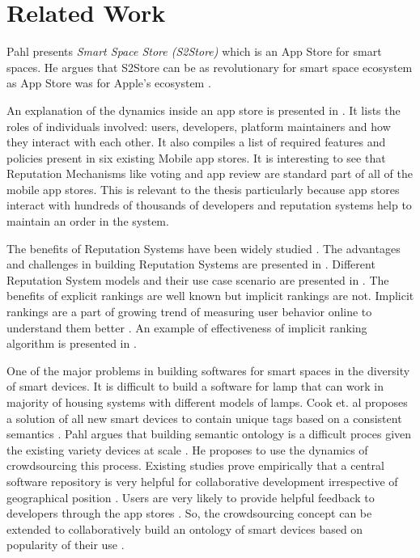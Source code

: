 \chapter{Related Work}

Pahl presents \emph{Smart Space Store (S2Store)} which is an App Store for smart spaces. He argues that S2Store can be as revolutionary for smart space ecosystem as App Store was for Apple's ecosystem \cite{pahl2014distributed}.

An explanation of the dynamics inside an app store is presented in \cite{Jansen}. It lists the roles of individuals involved: users, developers, platform maintainers and how they interact with each other. It also compiles a list of required features and policies present in six existing Mobile app stores. It is interesting to see that Reputation Mechanisms like voting and app review are standard part of all of the mobile app stores. This is relevant to the thesis particularly because app stores interact with hundreds of thousands of developers \cite{lim2012successful} and reputation systems help to maintain an order in the system.

The benefits of Reputation Systems have been widely studied \cite{Akerlof1970} \cite{Axelrod1984} \cite{Resnick2000} \cite{farmer2010building}. The advantages and challenges in building Reputation Systems are presented in \cite{Resnick2000}. Different Reputation System models and their use case scenario are presented in \cite{farmer2010building}. The benefits of explicit rankings are well known but implicit rankings are not. Implicit rankings are a part of growing trend of measuring user behavior online to understand them better \cite{claypool2001inferring}. An example of effectiveness of implicit ranking algorithm is presented in \cite{girardello2010explicit}.

One of the major problems in building softwares for smart spaces in the diversity of smart devices. It is difficult to build a software for lamp that can work in majority of housing systems with different models of lamps. Cook et. al proposes a solution of all new smart devices to contain unique tags based on a consistent semantics \cite{Cook2012}. Pahl argues that building semantic ontology is a difficult proces given the existing variety devices at scale \cite{pahl2014distributed}. He proposes to use the dynamics of crowdsourcing this process. Existing studies prove empirically that a central software repository is very helpful for collaborative development irrespective of geographical position \cite{dabbish2012social}. Users are very likely to provide helpful feedback to developers through the app stores \cite{pagano2013user}. So, the crowdsourcing concept can be extended to collaboratively build an ontology of smart devices  based on popularity of their use \cite{pahl2014distributed}.

